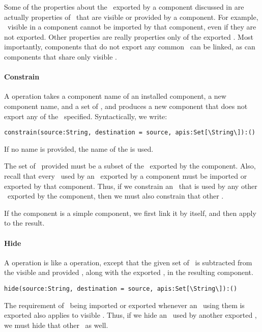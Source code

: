 Some of the properties about the \apisN\ exported by a component
discussed in 
are actually properties of \apisN\ that are visible or provided by a component.
For example,
\apisN\ visible in a component cannot be imported by that component,
even if they are not exported.
Other properties are really properties only of the exported \apisN.
Most importantly,
components that do not export any common \apisN\ can be linked,
as can components that share only visible \apisN.

\paragraph{Constrain}

A  operation takes
a component name of an installed component,
a new component name, and a set of \apisN,
and produces a new component that does not export any of the \apisN\ specified.
Syntactically, we write:

{\small\verb+constrain(source:String, destination = source, apis:Set[\String\]):()+}

If no  name is provided, the name of the 
is used.

The set of \apisN\ provided must be a subset of the \apisN\ exported
by the component.
Also, recall that every \apiN\ used by an \apiN\ exported by a component
must be imported or exported by that component.
Thus, if we constrain an \apiN\ that is used by any other \apiN\ exported
by the component,
then we must also constrain that other \apiN.

If the component is a simple component,
we first link it by itself,
and then apply  to the result.

\paragraph{Hide}

A  operation is like a  operation,
except that the given set of \apisN\ is subtracted from
the visible and provided \apisN, along with the exported \apisN,
in the resulting component.

{\small\verb+hide(source:String, destination = source, apis:Set[\String\]):()+}

The requirement of \apisN\ being imported or exported whenever
an \apiN\ using them is exported
also applies to visible \apisN.
Thus, if we hide an \apiN\ used by another exported \apiN,
we must hide that other \apiN\ as well.

